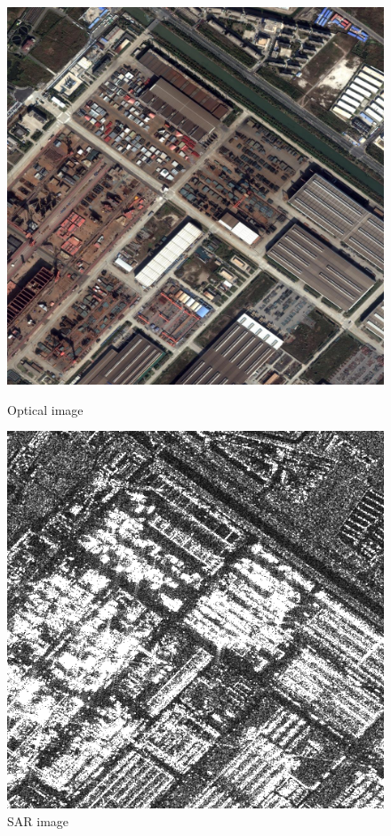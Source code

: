 \documentclass[]{IEEEtran}
\begin{document}
\newpage


\begin{figure}
	\vspace{2.5cm}
	\begin{minipage}[t]{0.5\linewidth}
		\centering
		\includegraphics[width=0.9\columnwidth]{fw}
		\caption{Optical image}
		\label{fig:fw}
	\end{minipage}%
	\begin{minipage}[t]{0.5\linewidth}
		\centering
		\includegraphics[width=0.9\columnwidth]{rt}
		\caption{SAR image}
		\label{fig:rt}
	\end{minipage}
\end{figure}
\end{document}
